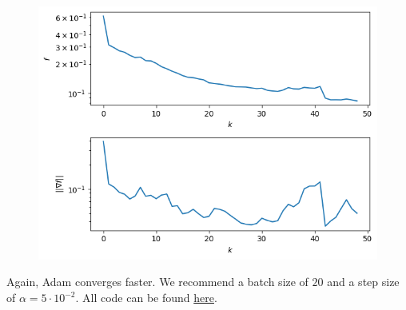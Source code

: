 \documentclass{../kin_math}
\begin{document}
\begin{questions}
\begin{solution}
\begin{figure}
      \includegraphics[scale=0.8]{stoch_adam.png}
    \end{figure}
    Again, Adam converges faster. We recommend a batch size of $20$ and a step size of $\alpha = 5 \cdot 10^{-2}$. All code can be found \href{https://github.com/elijahkin/amsc660/blob/main/hw13/hw13.ipynb}{here}.
  \end{solution}


\end{questions}
\end{document}
